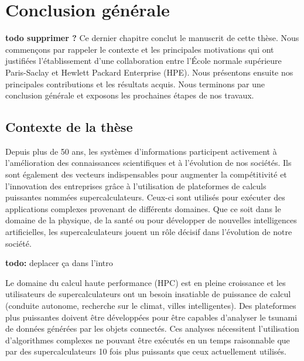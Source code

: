 \chapter{Conclusion générale}
\label{chap:conclusion}
\glsresetall

    \textbf{todo supprimer ?}
    Ce dernier chapitre conclut le manuscrit de cette thèse. Nous commençons par rappeler le contexte et les principales motivations qui ont justifiées l'établissement d'une collaboration entre l'École normale supérieure Paris-Saclay et Hewlett Packard Enterprise (HPE). Nous présentons ensuite nos principales contributions et les résultats acquis. Nous terminons par une conclusion générale et exposons les prochaines étapes de nos travaux.
      

\section{Contexte de la thèse}
        
    
    
        Depuis plus de 50 ans, les systèmes d’informations participent activement à l’amélioration des connaissances scientifiques et à l’évolution de nos sociétés. Ils sont également des vecteurs indispensables pour augmenter la compétitivité et l’innovation des entreprises grâce à l'utilisation de plateformes de calculs puissantes nommées supercalculateurs. Ceux-ci sont utilisés pour exécuter des applications complexes provenant de différents domaines. Que ce soit dans le domaine de la physique, de la santé ou pour développer de nouvelles intelligences artificielles, les supercalculateurs jouent un rôle décisif dans l'évolution de notre société.
 
 
    \textbf{todo:} deplacer ça dans l'intro
    
        Le domaine du calcul haute performance (HPC) est en pleine croissance et les utilisateurs de supercalculateurs ont un besoin insatiable de puissance de calcul (conduite autonome, recherche sur le climat, villes intelligentes). Des plateformes plus puissantes doivent être développées pour être capables d'analyser le tsunami de données générées par les objets connectés. Ces analyses nécessitent l'utilisation d'algorithmes complexes ne pouvant être exécutés en un temps raisonnable que par des supercalculateurs 10 fois plus puissants que ceux actuellement utilisés. 
       
